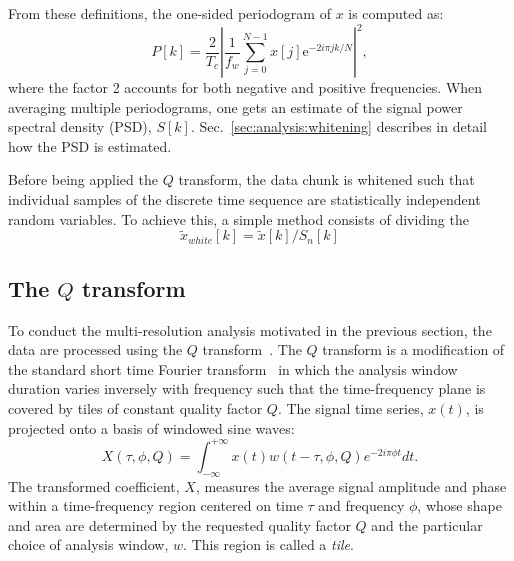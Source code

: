 From these definitions, the one-sided periodogram of $x$ is computed as:
\begin{equation}
  P[k]= \frac{2}{T_c}\left| \frac{1}{f_w}\sum_{j=0}^{N-1}{x[j]\mathrm{e}^{-2i\pi jk/N}} \right|^2,
\end{equation}
where the factor 2 accounts for both negative and positive frequencies. When averaging multiple periodograms, one gets an estimate of the signal power spectral density (PSD), $S[k]$. Sec.~\ref{sec:analysis:whitening} describes in detail how the PSD is estimated. 

Before being applied the $Q$ transform, the data chunk is whitened such that individual samples of the discrete time sequence are statistically independent random variables. To achieve this, a simple method consists of dividing the 
\begin{equation}
  \tilde{x}_{white}[k] = \tilde{x}[k]/S_n[k]
\end{equation}

\subsection{The $Q$ transform} \label{sec:analysis:qtransform}
To conduct the multi-resolution analysis motivated in the previous section, the data are processed using the $Q$ transform~\cite{Brown:1991}. The $Q$ transform is a modification of the standard short time Fourier transform~\cite{Gabor:1946} in which the analysis window duration varies inversely with frequency such that the time-frequency plane is covered by tiles of constant quality factor $Q$. The signal time series, $x(t)$, is projected onto a basis of windowed sine waves:
\begin{equation}
  X(\tau, \phi, Q) = \int_{-\infty}^{+\infty}{ x(t) w(t-\tau,\phi,Q) e^{-2i\pi\phi t}dt}.
  \label{eq:qtransform1}
\end{equation}
The transformed coefficient, $X$, measures the average signal amplitude and phase within a time-frequency region centered on time $\tau$ and frequency $\phi$, whose shape and area are determined by the requested quality factor $Q$ and the particular choice of analysis window, $w$. This region is called a \textit{tile}.

